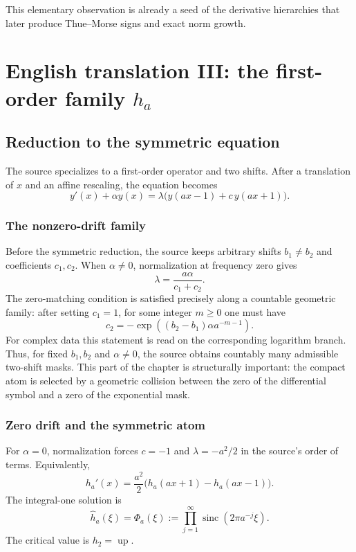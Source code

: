 \documentclass[11pt,oneside]{article}
\numberwithin{equation}{section}
\theoremstyle{definition}
\theoremstyle{remark}
\newcommand{\Up}{\operatorname{up}}
\newcommand{\sinc}{\operatorname{sinc}}
\begin{document}
This elementary observation is already a seed of the derivative hierarchies
that later produce Thue--Morse signs and exact norm growth.

\section{English translation III: the first-order family \texorpdfstring{$h_a$}{h-a}}

\subsection{Reduction to the symmetric equation}

The source specializes to a first-order operator and two shifts.  After a
translation of $x$ and an affine rescaling, the equation becomes
\begin{equation}\label{p6:eq:first-order-general}
 y'(x)+\alpha y(x)=\lambda\bigl(y(ax-1)+c\,y(ax+1)\bigr).
\end{equation}

\subsubsection{The nonzero-drift family}
Before the symmetric reduction, the source keeps arbitrary shifts $b_1\ne b_2$
and coefficients $c_1,c_2$.  When $\alpha\ne0$, normalization at frequency
zero gives
\begin{equation}\label{p6:eq:alpha-nonzero-lambda}
 \lambda=\frac{a\alpha}{c_1+c_2}.
\end{equation}
The zero-matching condition is satisfied precisely along a countable geometric
family: after setting $c_1=1$, for some integer $m\ge0$ one must have
\begin{equation}\label{p6:eq:alpha-nonzero-c2}
 c_2=-\exp\!\left((b_2-b_1)\alpha a^{-m-1}\right).
\end{equation}
For complex data this statement is read on the corresponding logarithm branch.
Thus, for fixed $b_1,b_2$ and $\alpha\ne0$, the source obtains countably many
admissible two-shift masks.  This part of the chapter is structurally important:
the compact atom is selected by a geometric collision between the zero of the
differential symbol and a zero of the exponential mask.

\subsubsection{Zero drift and the symmetric atom}
For $\alpha=0$, normalization forces $c=-1$ and $\lambda=-a^2/2$ in the
source's order of terms.  Equivalently,
\begin{equation}\label{p6:eq:ha-diffeq}
 h_a'(x)=\frac{a^2}{2}\bigl(h_a(ax+1)-h_a(ax-1)\bigr).
\end{equation}
The integral-one solution is
\begin{equation}\label{p6:eq:ha-fourier}
 \widehat h_a(\xi)=\Phi_a(\xi)
 :=\prod_{j=1}^{\infty}\sinc(2\pi a^{-j}\xi).
\end{equation}
The critical value is $h_2=\Up$.
\end{document}
